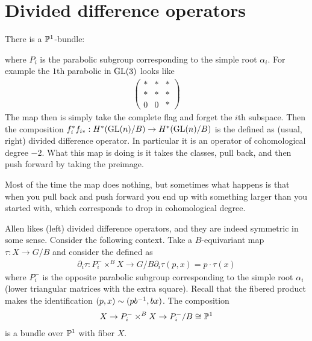 \documentclass[12pt]{article}
\begin{document}
\section{Divided difference operators}
There is a $\P^1$-bundle:
\begin{center}
\end{center} where $P_i$ is the parabolic subgroup corresponding to the simple root $\alpha_i$. For example
the $1$th parabolic in $\GL(3)$ looks like \begin{align*}
	\begin{pmatrix}
		* & * & * \\
		* & * & * \\
		0 & 0 & *
	\end{pmatrix}
\end{align*} The map then is simply take the complete flag and forget the $i$th subspace.
Then the composition $f_i^*f_{i*}:H^*(\GL(n)/B)\to H^*(\GL(n)/B)$ is the defined as (usual, right)
divided difference operator. In particular it is an operator of cohomological degree $-2$.
What this map is doing is it takes the classes, pull back, and then push forward by
taking the preimage.

\hfill

Most of the time the map does nothing, but sometimes what happens is that when you pull back and push forward
you end up with something larger than you started with, which corresponds to drop in cohomological degree.

\hfill

Allen likes (left) divided difference operators, and they are indeed symmetric in some sense.
Consider the following context. Take a $B$-equivariant map $\tau: X\to G/B$ and consider the 
defined as \begin{align*}
	\partial_i\tau: P^-_i\times^B X \to G/B
	\partial_i\tau(p,x) = p\cdot \tau(x)
\end{align*} where $P^-_i$ is the opposite parabolic subgroup corresponding to the simple root $\alpha_i$
(lower triangular matrices with the extra square). Recall that the fibered product makes the identification
$(p,x)\sim (p\inv{b},bx)$. The composition \begin{align*}
	X \to P^-_i\times^B X \to P^-_i/B \cong \P^1
\end{align*} is a bundle over $\P^1$ with fiber $X$.
\end{document}
